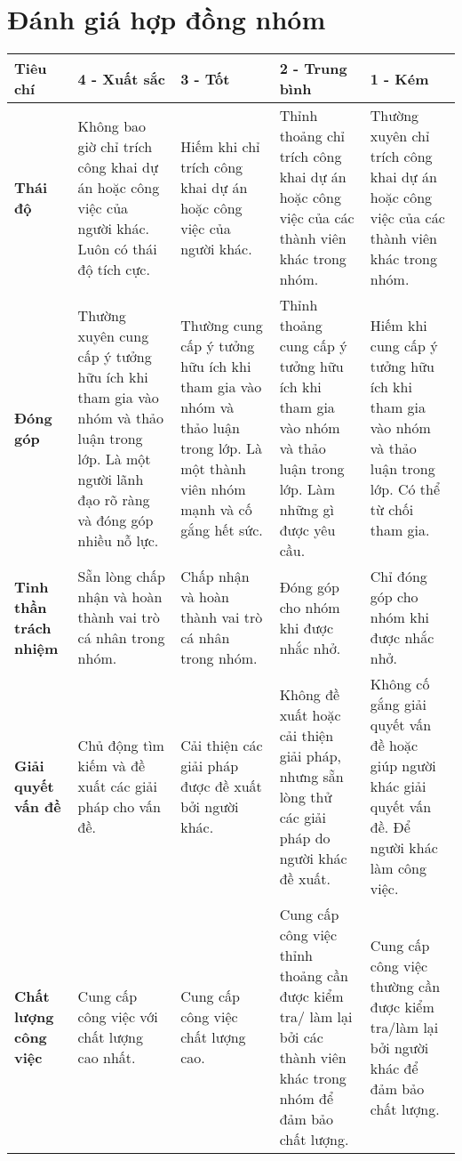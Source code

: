 \documentclass[a4paper, 12pt]{article}
\begin{document}
\section{Đánh giá hợp đồng nhóm}
\begin{tabular}{|p{2cm}|p{3cm}|p{3cm}|p{3cm}|p{3cm}|}
    \hline
    \textbf{Tiêu chí} & \textbf{4 - Xuất sắc} & \textbf{3 - Tốt} & \textbf{2 - Trung bình} & \textbf{1 - Kém}\\
    \hline
    \textbf{Thái độ} & Không bao giờ chỉ trích công khai dự án hoặc công việc của người khác. Luôn có thái độ tích cực. & Hiếm khi chỉ trích công khai dự án hoặc công việc của người khác. & Thỉnh thoảng chỉ trích công khai dự án hoặc công việc của các thành viên khác trong nhóm. & Thường xuyên chỉ trích công khai dự án hoặc công việc của các thành viên khác trong nhóm.\\
    \hline
    \textbf{Đóng góp} & Thường xuyên cung cấp ý tưởng hữu ích khi tham gia vào nhóm và thảo luận trong lớp. Là một người lãnh đạo rõ ràng và đóng góp nhiều nỗ lực. & Thường cung cấp ý tưởng hữu ích khi tham gia vào nhóm và thảo luận trong lớp. Là một thành viên nhóm mạnh và cố gắng hết sức. & Thỉnh thoảng cung cấp ý tưởng hữu ích khi tham gia vào nhóm và thảo luận trong lớp. Làm những gì được yêu cầu. & Hiếm khi cung cấp ý tưởng hữu ích khi tham gia vào nhóm và thảo luận trong lớp. Có thể từ chối tham gia.\\
    \hline
    \textbf{Tinh thần trách nhiệm} & Sẵn lòng chấp nhận và hoàn thành vai trò cá nhân trong nhóm. & Chấp nhận và hoàn thành vai trò cá nhân trong nhóm. & Đóng góp cho nhóm khi được nhắc nhở. & Chỉ đóng góp cho nhóm khi được nhắc nhở.\\
    \hline
    \textbf{Giải quyết vấn đề} & Chủ động tìm kiếm và đề xuất các giải pháp cho vấn đề. & Cải thiện các giải pháp được đề xuất bởi người khác. & Không đề xuất hoặc cải thiện giải pháp, nhưng sẵn lòng thử các giải pháp do người khác đề xuất. & Không cố gắng giải quyết vấn đề hoặc giúp người khác giải quyết vấn đề. Để người khác làm công việc.\\
    \hline
    \textbf{Chất lượng công việc} & Cung cấp công việc với chất lượng cao nhất. & Cung cấp công việc chất lượng cao. & Cung cấp công việc thỉnh thoảng cần được kiểm tra/ làm lại bởi các thành viên khác trong nhóm để đảm bảo chất lượng. & Cung cấp công việc thường cần được kiểm tra/làm lại bởi người khác để đảm bảo chất lượng.\\
    \hline
\end{tabular}
\end{document}
